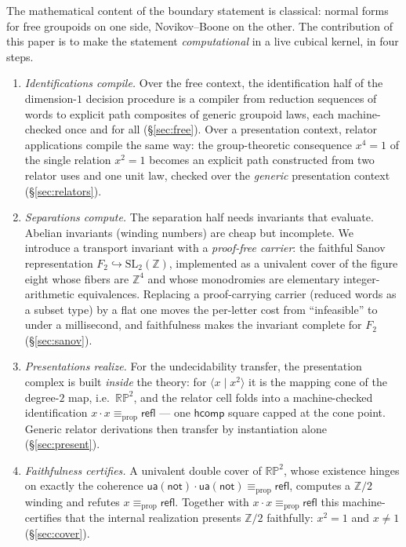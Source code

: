 \documentclass[11pt]{amsart}
\theoremstyle{definition}
\newcommand{\propeq}{\equiv_{\mathrm{prop}}}
\newcommand{\refl}{\mathsf{refl}}
\newcommand{\hcomp}{\mathsf{hcomp}}
\newcommand{\ua}{\mathsf{ua}}
\newcommand{\trns}{\mathbin{\cdot}}
\newcommand{\Ftwo}{F_2}
\newcommand{\SL}{\mathrm{SL}_2(\mathbb{Z})}
\newcommand{\RP}{\mathbb{RP}^2}
\begin{document}
The mathematical content of the boundary statement is classical:
normal forms for free groupoids on one side, Novikov--Boone on the
other.  The contribution of this paper is to make the statement
\emph{computational} in a live cubical kernel, in four steps.

\begin{enumerate}
\item \emph{Identifications compile.}  Over the free context, the
  identification half of the dimension-$1$ decision procedure is a
  compiler from reduction sequences of words to explicit path
  composites of generic groupoid laws, each machine-checked once and
  for all (\S\ref{sec:free}).  Over a presentation context, relator
  applications compile the same way: the group-theoretic consequence
  $x^4 = 1$ of the single relation $x^2 = 1$ becomes an explicit
  path constructed from two relator uses and one unit law, checked
  over the \emph{generic} presentation context
  (\S\ref{sec:relators}).
\item \emph{Separations compute.}  The separation half needs
  invariants that evaluate.  Abelian invariants (winding numbers)
  are cheap but incomplete.  We introduce a transport invariant with
  a \emph{proof-free carrier}: the faithful Sanov representation
  $\Ftwo \hookrightarrow \SL$, implemented as a univalent cover of
  the figure eight whose fibers are $\mathbb{Z}^4$ and whose
  monodromies are elementary integer-arithmetic equivalences.
  Replacing a proof-carrying carrier (reduced words as a subset
  type) by a flat one moves the per-letter cost from ``infeasible''
  to under a millisecond, and faithfulness makes the invariant
  complete for $\Ftwo$ (\S\ref{sec:sanov}).
\item \emph{Presentations realize.}  For the undecidability
  transfer, the presentation complex is built \emph{inside} the
  theory: for $\langle x \mid x^2 \rangle$ it is the mapping cone of
  the degree-$2$ map, i.e.\ $\RP$, and the relator cell folds into a
  machine-checked identification $x \trns x \propeq \refl$ --- one
  $\hcomp$ square capped at the cone point.  Generic relator
  derivations then transfer by instantiation alone
  (\S\ref{sec:present}).
\item \emph{Faithfulness certifies.}  A univalent double cover of
  $\RP$, whose existence hinges on exactly the coherence
  $\ua(\mathsf{not}) \trns \ua(\mathsf{not}) \propeq \refl$,
  computes a $\mathbb{Z}/2$ winding and refutes $x \propeq \refl$.
  Together with $x \trns x \propeq \refl$ this machine-certifies
  that the internal realization presents $\mathbb{Z}/2$ faithfully:
  $x^2 = 1$ and $x \neq 1$ (\S\ref{sec:cover}).
\end{enumerate}
\end{document}
